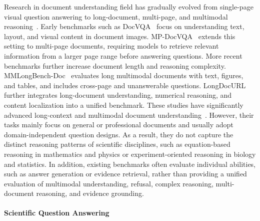 \documentclass{article} %
\begin{document}
Research in document understanding field has gradually evolved from single-page visual question answering to long-document, multi-page, and multimodal reasoning~\citep{han2025mdocagent,hu2025mplug}.
Early benchmarks such as DocVQA~\citep{mathew2021docvqa} focus on understanding text, layout, and visual content in document images. MP-DocVQA~\citep{tito2023hierarchical} extends this setting to multi-page documents, requiring models to retrieve relevant information from a larger page range before answering questions. More recent benchmarks further increase document length and reasoning complexity. MMLongBench-Doc~\citep{ma2024mmlongbench} evaluates long multimodal documents with text, figures, and tables, and includes cross-page and unanswerable questions. LongDocURL~\citep{deng2025longdocurl} further integrates long-document understanding, numerical reasoning, and content localization into a unified benchmark. These studies have significantly advanced long-context and multimodal document understanding~\citep{chia2025m,wang2025wilddoc}. However, their tasks mainly focus on general or professional documents and usually adopt domain-independent question designs. As a result, they do not capture the distinct reasoning patterns of scientific disciplines, such as equation-based reasoning in mathematics and physics or experiment-oriented reasoning in biology and statistics. In addition, existing benchmarks often evaluate individual abilities, such as answer generation or evidence retrieval, rather than providing a unified evaluation of multimodal understanding, refusal, complex reasoning, multi-document reasoning, and evidence grounding.

\paragraph{Scientific Question Answering}
\end{document}
